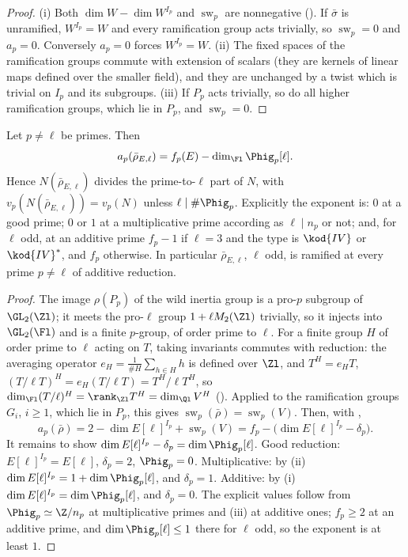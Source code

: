 \begin{proof}
(i) Both $\dim W-\dim W^{I_p}$ and $\operatorname{sw}_p$ are nonnegative (). If $\bar\sigma$ is unramified, $W^{I_p}=W$ and every ramification group acts
trivially, so $\operatorname{sw}_p=0$ and $a_p=0$. Conversely $a_p=0$ forces $W^{I_p}=W$. (ii) The fixed spaces of the ramification groups commute with
extension of scalars (they are kernels of linear maps defined over the smaller field), and they are unchanged by a twist which is trivial on
$I_p$ and its subgroups. (iii) If $P_p$ acts trivially, so do all higher ramification groups, which lie in $P_p$, and $\operatorname{sw}_p=0$.
\end{proof}

\begin{proposition}\label{prop:galrep:serre-conductor-E}
Let $p\ne\ell$ be primes. Then
\[
a_p(\bar\rho_{E,\ell})=f_p(E)-\dim_{\Fl}\Phig_p[\ell].
\]
Hence $N(\bar\rho_{E,\ell})$ divides the prime-to-$\ell$ part of $N$, with $v_p(N(\bar\rho_{E,\ell}))=v_p(N)$ unless $\ell\mid\#\Phig_p$. Explicitly the exponent is: $0$ at a
good prime; $0$ or $1$ at a multiplicative prime according as $\ell\mid n_p$ or not; and, for $\ell$ odd, at an additive prime $f_p-1$ if $\ell=3$ and the type
is $\kod{IV}$ or $\kod{IV}^*$, and $f_p$ otherwise. In particular $\bar\rho_{E,\ell}$, $\ell$ odd, is ramified at every prime $p\ne\ell$ of additive reduction.
\end{proposition}

\begin{proof}
The image $\rho(P_p)$ of the wild inertia group is a pro-$p$ subgroup of $\GL_2(\Zl)$; it meets the pro-$\ell$ group $1+\ell M_2(\Zl)$ trivially, so it injects
into $\GL_2(\Fl)$ and is a finite $p$-group, of order prime to $\ell$. For a finite group $H$ of order prime to $\ell$ acting on $T$, taking invariants
commutes with reduction: the averaging operator $e_H=\frac1{\#H}\sum_{h\in H}h$ is defined over $\Zl$, and $T^H=e_HT$, $(T/\ell T)^H=e_H(T/\ell T)=T^H/\ell T^H$, so
$\dim_{\Fl}(T/\ell)^H=\rank_{\Zl}T^H=\dim_{\Ql}V^H$ (). Applied to the ramification groups $G_i$, $i\ge1$, which lie in $P_p$, this gives
$\operatorname{sw}_p(\bar\rho)=\operatorname{sw}_p(V)$. Then, with ,
\[
a_p(\bar\rho)=2-\dim E[\ell]^{I_p}+\operatorname{sw}_p(V)=f_p-\bigl(\dim E[\ell]^{I_p}-\delta_p\bigr).
\]
It remains to show $\dim E[\ell]^{I_p}-\delta_p=\dim\Phig_p[\ell]$. Good reduction: $E[\ell]^{I_p}=E[\ell]$, $\delta_p=2$, $\Phig_p=0$. Multiplicative: by
(ii) $\dim E[\ell]^{I_p}=1+\dim\Phig_p[\ell]$, and $\delta_p=1$. Additive: by (i)
$\dim E[\ell]^{I_p}=\dim\Phig_p[\ell]$, and $\delta_p=0$. The explicit values follow from $\Phig_p\simeq\Z/n_p$ at multiplicative primes and
(iii) at additive ones; $f_p\ge2$ at an additive prime, and $\dim\Phig_p[\ell]\le1$ there for $\ell$ odd, so the exponent is
at least $1$.
\end{proof}

